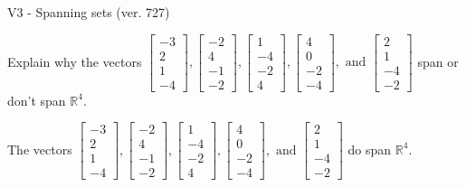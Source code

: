 \begin{exercise}
  \begin{exerciseTitle}V3 - Spanning sets (ver. 727)\end{exerciseTitle}
  \begin{exerciseStatement}
    Explain why the vectors \(\left[\begin{array}{r}
-3 \\
2 \\
1 \\
-4
\end{array}\right] , \left[\begin{array}{r}
-2 \\
4 \\
-1 \\
-2
\end{array}\right] , \left[\begin{array}{r}
1 \\
-4 \\
-2 \\
4
\end{array}\right] , \left[\begin{array}{r}
4 \\
0 \\
-2 \\
-4
\end{array}\right] , \text{ and } \left[\begin{array}{r}
2 \\
1 \\
-4 \\
-2
\end{array}\right]\) span or don't span \(\mathbb{R}^4\). 
	


  \end{exerciseStatement}
  \begin{exerciseAnswer}
   The vectors \(\left[\begin{array}{r}
-3 \\
2 \\
1 \\
-4
\end{array}\right] , \left[\begin{array}{r}
-2 \\
4 \\
-1 \\
-2
\end{array}\right] , \left[\begin{array}{r}
1 \\
-4 \\
-2 \\
4
\end{array}\right] , \left[\begin{array}{r}
4 \\
0 \\
-2 \\
-4
\end{array}\right] , \text{ and } \left[\begin{array}{r}
2 \\
1 \\
-4 \\
-2
\end{array}\right]\) 
  	 do  
	span \(\mathbb{R}^4\).
  



\end{exerciseAnswer}
\end{exercise}
